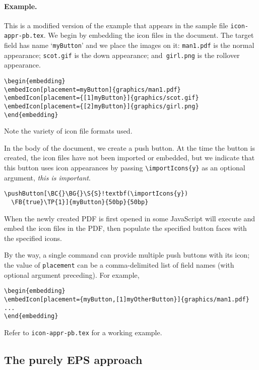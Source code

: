 \documentclass{article}
\def\mpFmt{\raggedleft\itshape\small}
\begin{document}
\paragraph*{Example.} This is a modified version of the example that appears
in the sample file \texttt{icon-appr-pb.tex}. We begin by embedding the icon
files in the document. The target field has name `\texttt{myButton}' and we
place the images on it: \texttt{man1.pdf} is the normal appearance;
\texttt{scot.gif} is the down appearance; and\texttt{ girl.png} is the
rollover appearance.
\begin{Verbatim}[xleftmargin=\parindent,fontsize=\small]
\begin{embedding}
\embedIcon[placement=myButton]{graphics/man1.pdf}
\embedIcon[placement={[1]myButton}]{graphics/scot.gif}
\embedIcon[placement={[2]myButton}]{graphics/girl.png}
\end{embedding}
\end{Verbatim}
Note the variety of icon file formats used.

In the body of the document, we create a push button. At the time
the button is created, the icon files have not been imported or embedded,
but we indicate that this button uses icon appearances by passing
\verb~\importIcons{y}~ as an optional argument, \emph{this is
important}.\marginpar{\mpFmt Important!}
\begin{Verbatim}[xleftmargin=\parindent,fontsize=\small,commandchars=!()]
\pushButton[\BC{}\BG{}\S{S}!textbf(\importIcons{y})
  \FB{true}\TP{1}]{myButton}{50bp}{50bp}
\end{Verbatim}
When the newly created PDF is first opened in  some JavaScript
will execute and embed the icon files in the PDF, then populate the specified
button faces with the specified icons.

By the way, a single  command can provide multiple push buttons with
its icon; the value of \texttt{placement} can be a comma-delimited list of
field names (with optional argument preceding). For example,
\begin{Verbatim}[xleftmargin=\parindent,fontsize=\small]
\begin{embedding}
\embedIcon[placement={myButton,[1]myOtherButton}]{graphics/man1.pdf}
...
\end{embedding}
\end{Verbatim}
Refer to \texttt{icon-appr-pb.tex} for a working example.


\subsection{The purely EPS approach}\label{s:EPSMethods}
\end{document}
